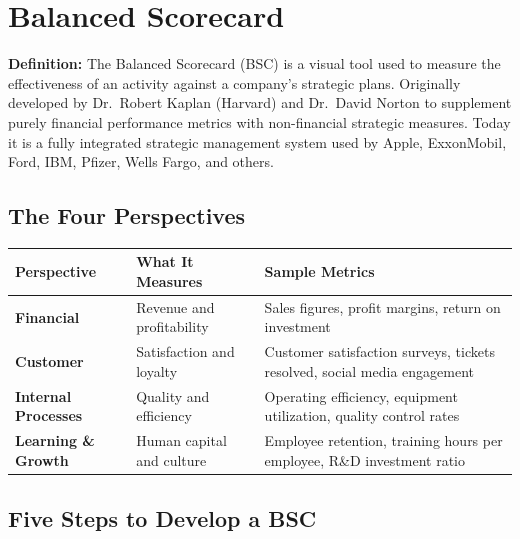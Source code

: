 \documentclass[11pt, letterpaper]{article}
\begin{document}
\newpage

\section{Balanced Scorecard}

\begin{defbox}
\textbf{Definition:} The Balanced Scorecard (BSC) is a visual tool used to measure the effectiveness of an activity against a company's strategic plans. Originally developed by Dr.\ Robert Kaplan (Harvard) and Dr.\ David Norton to supplement purely financial performance metrics with non-financial strategic measures. Today it is a fully integrated strategic management system used by Apple, ExxonMobil, Ford, IBM, Pfizer, Wells Fargo, and others.
\end{defbox}

\subsection{The Four Perspectives}

\begin{center}
\begin{tabular}{>{\bfseries}p{3.5cm} p{4cm} p{5.5cm}}
\toprule
Perspective & What It Measures & Sample Metrics \\
\midrule
Financial & Revenue and profitability & Sales figures, profit margins, return on investment \\
\addlinespace
Customer & Satisfaction and loyalty & Customer satisfaction surveys, tickets resolved, social media engagement \\
\addlinespace
Internal Processes & Quality and efficiency & Operating efficiency, equipment utilization, quality control rates \\
\addlinespace
Learning \& Growth & Human capital and culture & Employee retention, training hours per employee, R\&D investment ratio \\
\bottomrule
\end{tabular}
\end{center}

\subsection{Five Steps to Develop a BSC}
\end{document}
